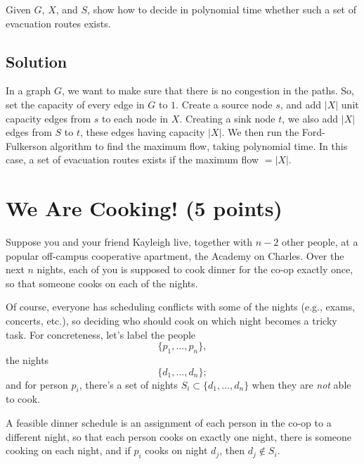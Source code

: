 \documentclass[letter,11pt]{article}
\begin{document}
Given $G$, $X$, and $S$, show how to decide in polynomial time whether such a set of evacuation routes exists.

\subsection{Solution}

In a graph $G$, we want to make sure that there is no congestion in the paths. So, set the capacity of every edge in $G$ to $1$. Create a source node $s$, and add $|X|$ unit capacity edges from $s$ to each node in $X$. Creating a sink node $t$, we also add $|X|$ edges from $S$ to $t$, these edges having capacity $|X|$. We then run the Ford-Fulkerson algorithm to find the maximum flow, taking polynomial time. In this case, a set of evacuation routes exists if the maximum flow $= |X|$.

\section{We Are Cooking! (5 points)}

Suppose you and your friend Kayleigh live, together with $n - 2$ other people, at a popular off-campus cooperative apartment, the Academy on Charles. Over the next $n$ nights, each of you is supposed to cook dinner for the co-op exactly once, so that someone cooks on each of the nights.


Of course, everyone has scheduling conflicts with some of the nights (e.g., exams, concerts, etc.), so deciding who should cook on which night becomes a tricky task. For concreteness, let’s label the people $$\{p_1,..., p_n\},$$ the nights $$\{d_1,..., d_n\};$$ and for person $p_i$, there’s a set of nights $S_i \subset \{ d_1,..., d_n \}$ when they are {\it not} able to cook.


A feasible dinner schedule is an assignment of each person in the co-op to a different night, so that each person cooks on exactly one night, there is someone cooking on each night, and if $p_i$ cooks on night $d_j$, then $d_j \notin S_i$. 
\end{document}
